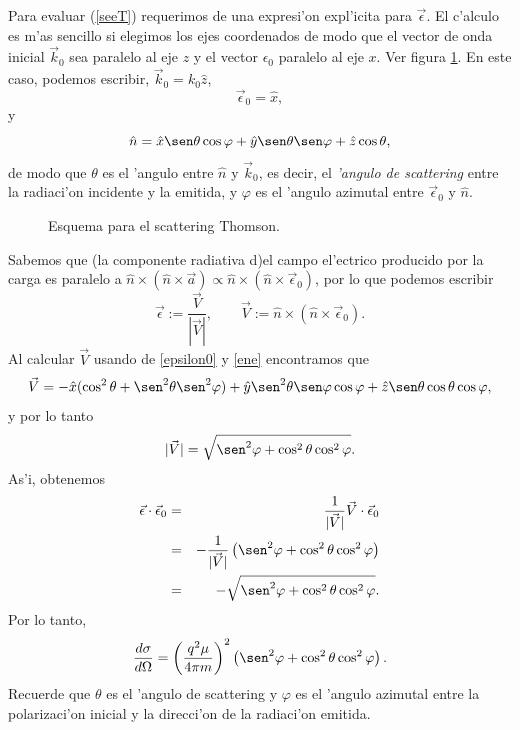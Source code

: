 Para evaluar (\ref{seeT}) requerimos de una expresi'on expl'icita para
$\vec{\epsilon}$. El c'alculo es m'as sencillo si elegimos los ejes coordenados de modo que el vector de onda inicial $\vec{k}_0$ sea paralelo al eje $z$ y el vector $\epsilon_0$ paralelo al eje $x$. Ver figura \ref{fig:thomson}. En este caso, podemos escribir, $\vec{k}_0=k_0\hat{z}$, 
\begin{equation}\label{epsilon0}
\vec\epsilon_0=\hat{x},
\end{equation}
y 
\begin{equation}
\hat{n}=\hat{x}\sen\theta\cos\varphi + \hat{y}\sen\theta\sen\varphi +\hat{z}\cos\theta, \label{ene}
\end{equation}
de modo que $\theta$ es el 'angulo entre $\hat{n}$ y $\vec{k}_0$, es decir, el
\textit{'angulo de scattering} entre la radiaci'on incidente y la emitida, y $\varphi$ es el 'angulo azimutal entre $\vec{\epsilon}_0$ y
$\hat{n}$.
\begin{figure}[H]
\centerline{}
 \caption{Esquema para el scattering Thomson.}
\label{fig:thomson}
\end{figure}
Sabemos que (la componente radiativa d)el campo el'ectrico producido por la carga es paralelo a
$\hat{n}\times(\hat{n}\times\vec{a})\propto
\hat{n}\times(\hat{n}\times\vec{\epsilon}_0)$, por lo que podemos escribir
\begin{equation}
\vec{\epsilon}:=\frac{\vec{V}}{|\vec{V}|}, \qquad
\vec{V}:=\hat{n}\times(\hat{n}\times\vec{\epsilon}_0).
\end{equation}
Al calcular $\vec{V}$ usando de \eqref{epsilon0} y \eqref{ene} encontramos que
\begin{equation}
\vec{V}=-\hat{x}(\cos^2\theta+\sen^2\theta\sen^2\varphi)+\hat{y}\sen^2\theta\sen\varphi\cos\varphi
+\hat{z}\sen\theta\cos\theta\cos\varphi,
\end{equation}
y por lo tanto
\begin{equation}
|\vec{V}|=\sqrt{\sen^2\varphi+\cos^2\theta\cos^2\varphi}.
\end{equation}
As'i, obtenemos
\begin{eqnarray}
 \vec{\epsilon}\cdot\vec{\epsilon}_0&=&\frac{1}{|\vec{V}|}
\vec{V}\cdot\vec{\epsilon}_0 \\
 &=& -\frac{1}{|\vec{V}|}\left(\sen^2\varphi+\cos^2\theta\cos^2\varphi \right) \\
  &=&-\sqrt{\sen^2\varphi+\cos^2\theta\cos^2\varphi} .
\end{eqnarray}
Por lo tanto,
\begin{equation}
\frac{d\sigma}{d\Omega}=\left(\frac{q^2\mu}{4\pi m}\right)^2
\left(\sen^2\varphi+\cos^2\theta\cos^2\varphi \right).
\end{equation}
Recuerde que $\theta$ es el 'angulo de scattering y $\varphi$ es el 'angulo
azimutal entre la polarizaci'on inicial y la direcci'on de la radiaci'on
emitida.

